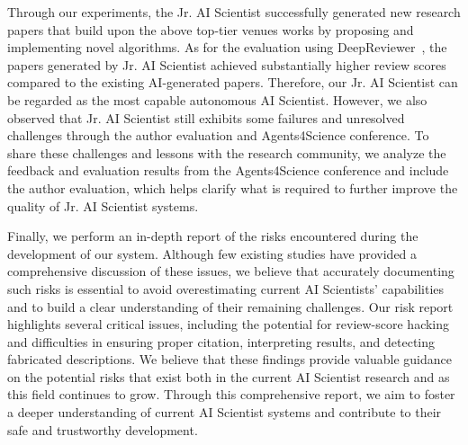 Through our experiments, the Jr. AI Scientist successfully generated new research papers that build upon the above top-tier venues works by proposing and implementing novel algorithms.
As for the evaluation using DeepReviewer~\citep{zhu2025deepreview}, the papers generated by Jr. AI Scientist achieved substantially higher review scores compared to the existing AI-generated papers. Therefore, our Jr. AI Scientist can be regarded as the most capable autonomous AI Scientist.
However, we also observed that Jr. AI Scientist still exhibits some failures and unresolved challenges through the author evaluation and Agents4Science conference. To share these challenges and lessons with the research community, we analyze the feedback and evaluation results from the Agents4Science conference and include the author evaluation, which helps clarify what is required to further improve the quality of Jr. AI Scientist systems. 

Finally, we perform an in-depth report of the risks encountered during the development of our system. Although few existing studies have provided a comprehensive discussion of these issues, we believe that accurately documenting such risks is essential to avoid overestimating current AI Scientists' capabilities and to build a clear understanding of their remaining challenges. 
Our risk report highlights several critical issues, including the potential for review-score hacking and difficulties in ensuring proper citation,  interpreting results, and detecting fabricated descriptions.
We believe that these findings provide valuable guidance on the potential risks that exist both in the current AI Scientist research and as this field continues to grow. Through this comprehensive report, we aim to foster a deeper understanding of current AI Scientist systems and contribute to their safe and trustworthy development.

